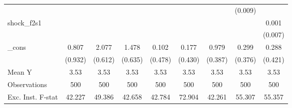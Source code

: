 {\begin{tabular}{l*{8}{c}}
            &                     &                     &                     &                     &                     &                     &     (0.009)         &                     \\
\addlinespace
shock\_f2s1  &                     &                     &                     &                     &                     &                     &                     &       0.001         \\
            &                     &                     &                     &                     &                     &                     &                     &     (0.007)         \\
\addlinespace
\_cons      &       0.807         &       2.077\sym{***}&       1.478\sym{**} &       0.102         &       0.177         &       0.979\sym{**} &       0.299         &       0.288         \\
            &     (0.932)         &     (0.612)         &     (0.635)         &     (0.478)         &     (0.430)         &     (0.387)         &     (0.376)         &     (0.421)         \\
\midrule
Mean Y      &        3.53         &        3.53         &        3.53         &        3.53         &        3.53         &        3.53         &        3.53         &        3.53         \\
Observations&         500         &         500         &         500         &         500         &         500         &         500         &         500         &         500         \\
Exc. Inst. F-stat&      42.227         &      49.386         &      42.658         &      42.784         &      72.904         &      42.261         &      55.307         &      55.357         \\
\bottomrule
\end{tabular}
}

